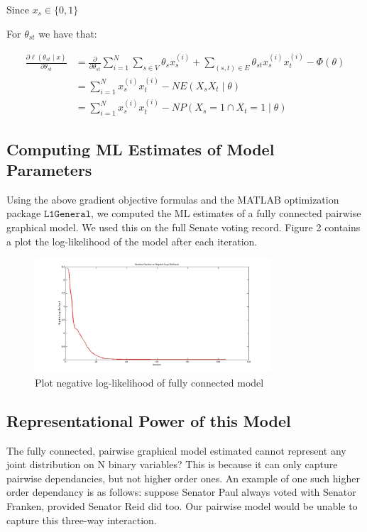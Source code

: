 \documentclass[]{article}
\begin{document}
Since \(x_s \in \{0,1\}\)

For \(\theta_{st}\) we have that:

\begin{align*}
\frac{\partial \ell(\theta_{st} \mid x)}{\partial \theta_{st}} &= \frac{\partial}{\partial \theta_{st}} \sum_{i=1}^N \sum_{s \in V}  \theta_{s}x_{s}^{(i)} + \sum_{(s,t) \in E} \theta_{st}x_{s}^{(i)}x_{t}^{(i)}-\Phi(\theta) \\
&=\sum_{i=1}^N x_{s}^{(i)}x_{t}^{(i)} - N E(X_s X_t \mid \theta) \\
&=\sum_{i=1}^N x_{s}^{(i)}x_{t}^{(i)} - N P(X_s = 1 \cap X_t = 1 \mid \theta)
\end{align*}

\subsection{Computing ML Estimates of Model
Parameters}\label{computing-ml-estimates-of-model-parameters}

Using the above gradient objective formulas and the MATLAB optimization
package \(\texttt{L1General}\), we computed the ML estimates of a fully
connected pairwise graphical model. We used this on the full Senate
voting record. Figure 2 contains a plot the log-likelihood of the model
after each iteration.

\begin{figure}
\begin{center}
\includegraphics[width=250pt]{figures/fig2.jpg}
\caption{Plot negative log-likelihood of fully connected model}
\end{center}
\end{figure}

\subsection{Representational Power of this
Model}\label{representational-power-of-this-model}

The fully connected, pairwise graphical model estimated cannot represent
any joint distribution on N binary variables? This is because it can
only capture pairwise dependancies, but not higher order ones. An
example of one such higher order dependancy is as follows: suppose
Senator Paul always voted with Senator Franken, provided Senator Reid
did too. Our pairwise model would be unable to capture this three-way
interaction.
\end{document}
